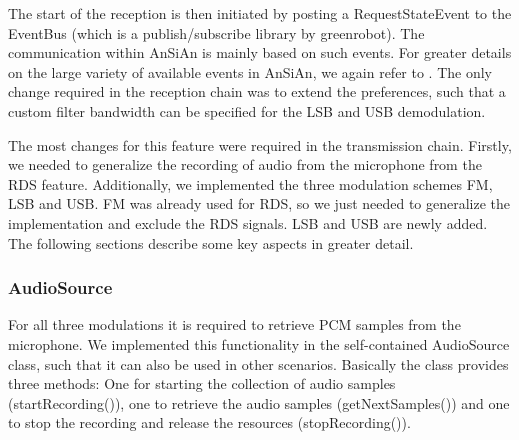 The start of the reception is then initiated by posting a RequestStateEvent to the EventBus (which is a publish/subscribe library by greenrobot). The communication within AnSiAn is mainly based on such events. For greater details on the large variety of available events in AnSiAn, we again refer to \cite{Kreis2015}. The only change required in the reception chain was to extend the preferences, such that a custom filter bandwidth can be specified for the LSB and USB demodulation. 

The most changes for this feature were required in the transmission chain. Firstly, we needed to generalize the recording of audio from the microphone from the RDS feature. Additionally, we implemented the three modulation schemes FM, LSB and USB. FM was already used for RDS, so we just needed to generalize the implementation and exclude the RDS signals. LSB and USB are newly added. The following sections describe some key aspects in greater detail. 

\subsubsection{AudioSource}

For all three modulations it is required to retrieve PCM samples from the microphone. We implemented this functionality in the self-contained AudioSource class, such that it can also be used in other scenarios. Basically the class provides three methods: One for starting the collection of audio samples (startRecording()), one to retrieve the audio samples (getNextSamples()) and one to stop the recording and release the resources (stopRecording()). 

